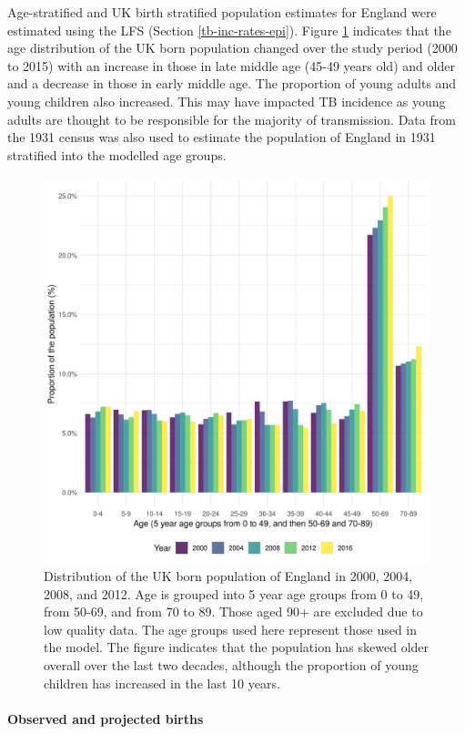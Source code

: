 \documentclass[11pt,twoside]{bristolthesis}
\begin{document}
  Age-stratified and UK birth stratified population estimates for England were estimated using the LFS (Section \ref{tb-inc-rates-epi}). Figure \ref{fig:age-strat-demo} indicates that the age distribution of the UK born population changed over the study period (2000 to 2015) with an increase in those in late middle age (45-49 years old) and older and a decrease in those in early middle age. The proportion of young adults and young children also increased. This may have impacted TB incidence as young adults are thought to be responsible for the majority of transmission. Data from the 1931 census was also used to estimate the population of England in 1931 stratified into the modelled age groups.
  \begin{figure}
  
  {\centering \includegraphics[width=0.8\linewidth,]{chapters/model-development/resources/figure/england_demographics} 
  
  }
  
  \caption[Distribution of the UK born population of England in 2000, 2004, 2008, and 2012.]{Distribution of the UK born population of England in 2000, 2004, 2008, and 2012. Age is grouped into 5 year age groups from 0 to 49, from 50-69, and from 70 to 89. Those aged 90+ are excluded due to low quality data. The age groups used here represent those used in the model. The figure indicates that the population has skewed older overall over the last two decades, although the proportion of young children has increased in the last 10 years.}\label{fig:age-strat-demo}
  \end{figure}
  \hypertarget{observed-and-projected-births}{%
  \paragraph{Observed and projected births}\label{observed-and-projected-births}}
  
\end{document}
